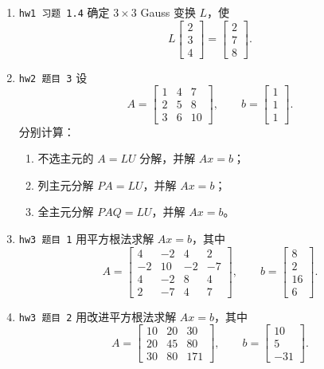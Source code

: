 \documentclass{article}
\begin{document}
\begin{enumerate}
  \item \texttt{hw1 习题 1.4} 确定 $3\times3$ Gauss 变换 $L$，使
  \[
    L\begin{bmatrix}2\\3\\4\end{bmatrix}
    =
    \begin{bmatrix}2\\7\\8\end{bmatrix}.
  \]

  \item \texttt{hw2 题目 3} 设
  \[
    A=\begin{bmatrix}1&4&7\\2&5&8\\3&6&10\end{bmatrix},\qquad
    b=\begin{bmatrix}1\\1\\1\end{bmatrix}.
  \]
  分别计算：
  \begin{enumerate}[(1)]
    \item 不选主元的 $A=LU$ 分解，并解 $Ax=b$；
    \item 列主元分解 $PA=LU$，并解 $Ax=b$；
    \item 全主元分解 $PAQ=LU$，并解 $Ax=b$。
  \end{enumerate}

  \item \texttt{hw3 题目 1} 用平方根法求解 $Ax=b$，其中
  \[
    A=
    \begin{bmatrix}
      4&-2&4&2\\
      -2&10&-2&-7\\
      4&-2&8&4\\
      2&-7&4&7
    \end{bmatrix},\qquad
    b=\begin{bmatrix}8\\2\\16\\6\end{bmatrix}.
  \]

  \item \texttt{hw3 题目 2} 用改进平方根法求解 $Ax=b$，其中
  \[
    A=
    \begin{bmatrix}
      10&20&30\\
      20&45&80\\
      30&80&171
    \end{bmatrix},\qquad
    b=\begin{bmatrix}10\\5\\-31\end{bmatrix}.
  \]


\end{enumerate}
\end{document}
